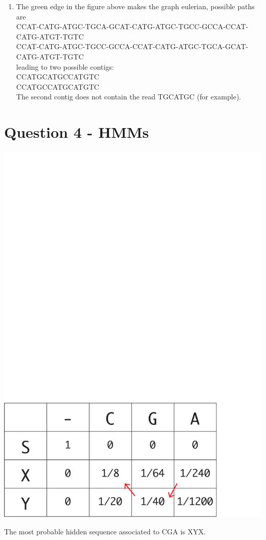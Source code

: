 \documentclass[a4paper,11pt]{article}
\begin{document}
\begin{enumerate}
\item 
The green edge in the figure above makes the graph eulerian,
possible paths are\\
\small{CCAT-CATG-ATGC-TGCA-GCAT-CATG-ATGC-TGCC-GCCA-CCAT-CATG-ATGT-TGTC}\\
\small{CCAT-CATG-ATGC-TGCC-GCCA-CCAT-CATG-ATGC-TGCA-GCAT-CATG-ATGT-TGTC }\\
\normalsize{leading to two possible contigs}:\\
CCATGCATGCCATGTC \\
CCATGCCATGCATGTC \\

The second contig does not contain the read TGCATGC (for example).
\end{enumerate}

\section*{Question 4 - HMMs}

\begin{center}
\includegraphics[scale=.5]{fig3.pdf}\\
\end{center}
The most probable hidden sequence associated to CGA is XYX.
\end{document}
